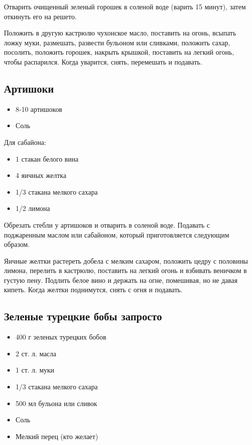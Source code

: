 Отварить очищенный зеленый горошек в соленой воде (варить 15 минут), затем откинуть его на решето.

Положить в другую кастрюлю чухонское масло, поставить на огонь, всыпать ложку муки, размешать, развести бульоном или сливками, положить сахар, посолить, положить горошек, накрыть крышкой, поставить на легкий огонь, чтобы распарился. Когда уварится, снять, перемешать и подавать.

\subsection{Артишоки}\label{6artishoki}

\begin{itemize}
	\item 8-10 артишоков 
    \item Соль
\end{itemize}

Для сабайона: 

\begin{itemize}
	\item 1 стакан белого вина \item 4 яичных желтка \item 1/3 стакана мелкого сахара \item 1/2 лимона
\end{itemize}

Обрезать стебли у артишоков и отварить в соленой воде. Подавать с поджаренным маслом или сабайоном, который приготовляется следующим образом.

Яичные желтки растереть добела с мелким сахаром, положить цедру с половины лимона, перелить в кастрюлю, поставить на легкий огонь и взбивать веничком в густую пену. Подлить белое вино и держать на огне, помешивая, но не давая кипеть. Когда желтки поднимутся, снять с огня и подавать.

\subsection{Зеленые турецкие бобы запросто}

\begin{itemize}
	\item 400 г зеленых турецких бобов
    \item 2 ст. л. масла
    \item 1 ст. л. муки 
    \item 1/3 стакана мелкого сахара 
    \item 500 мл бульона или сливок 
    \item Соль 
    \item Мелкий перец (кто желает)
\end{itemize}

